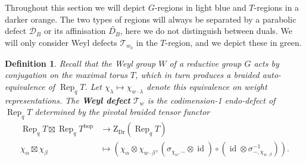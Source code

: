 \documentclass[a4paper]{article}
\numberwithin{equation}{section}
\newtheorem{definition}[counter]{Definition}
\newcommand{\1}{{\mathrm{1}\mkern-4mu{\mathchoice{}{}{\mskip-0.5mu}{\mskip-1mu}}\mathrm{l}}}
\DeclareMathOperator{\Rep}{Rep}
\newcommand{\D}{\mathcal{D}}
\newcommand{\T}{\mathcal{T}}
\newcommand{\bop}{\text{bop}}
\newcommand{\Zdr}{\mathrm{Z}_{\text{Dr}}}
\DeclareMathOperator{\id}{id}
\begin{document}
Throughout this section we will depict $G$-regions in light blue and $T$-regions in a darker orange. The two types of regions will always be separated by a parabolic defect $\D_B$ or its affinisation $\widetilde{D_B}$, here we do not distinguish between duals. We will only consider Weyl defects $\T_{w_0}$ in the $T$-region, and we depict these in green.

 \begin{definition}
    Recall that the Weyl group $W$ of a reductive group $G$ acts by conjugation on the maximal torus $T$, which in turn produces a braided auto-equivalence of $\Rep_qT$. Let $\chi_\lambda \mapsto \chi_{w\cdot\lambda}$ denote this equivalence on weight representations.
    The \emph{\bf Weyl defect} $\T_w$ is the codimension-1 endo-defect of $\Rep_qT$ determined by the pivotal braided tensor functor
\begin{equation}
    \begin{aligned}
        \Rep_qT \boxtimes \Rep_qT^{\bop} &\to \Zdr(\Rep_qT) \\
        \chi_\alpha\boxtimes \chi_\beta &\mapsto \left(\chi_\alpha \otimes\chi_{w\cdot \beta}, (\sigma_{\chi_\alpha,-}\otimes\id)\circ(\id \otimes \sigma^{-1}_{-,\chi_{w\cdot\beta}}) \right).
    \end{aligned}
\end{equation}
 \end{definition}
 
\end{document}

